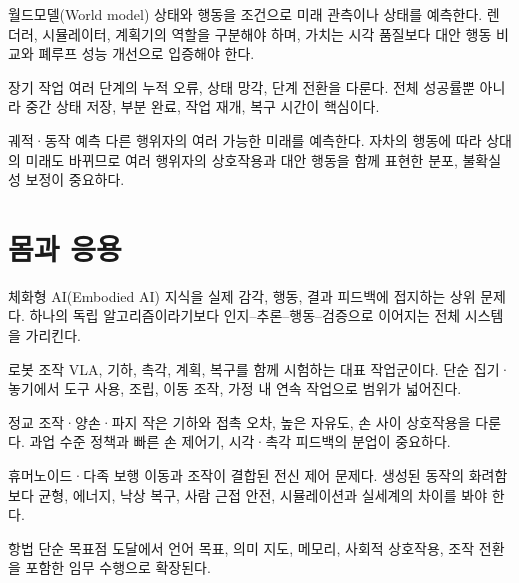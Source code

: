 \documentclass[11pt,openany]{book}
\begin{document}
\begin{termcard}{월드모델(World model)}
상태와 행동을 조건으로 미래 관측이나 상태를 예측한다. 렌더러, 시뮬레이터, 계획기의 역할을 구분해야 하며, 가치는 시각 품질보다 대안 행동 비교와 폐루프 성능 개선으로 입증해야 한다.
\end{termcard}

\begin{termcard}{장기 작업}
여러 단계의 누적 오류, 상태 망각, 단계 전환을 다룬다. 전체 성공률뿐 아니라 중간 상태 저장, 부분 완료, 작업 재개, 복구 시간이 핵심이다.
\end{termcard}

\begin{termcard}{궤적·동작 예측}
다른 행위자의 여러 가능한 미래를 예측한다. 자차의 행동에 따라 상대의 미래도 바뀌므로 여러 행위자의 상호작용과 대안 행동을 함께 표현한 분포, 불확실성 보정이 중요하다.
\end{termcard}

\chapter*{몸과 응용}

\begin{termcard}{체화형 AI(Embodied AI)}
지식을 실제 감각, 행동, 결과 피드백에 접지하는 상위 문제다. 하나의 독립 알고리즘이라기보다 인지--추론--행동--검증으로 이어지는 전체 시스템을 가리킨다.
\end{termcard}

\begin{termcard}{로봇 조작}
VLA, 기하, 촉각, 계획, 복구를 함께 시험하는 대표 작업군이다. 단순 집기·놓기에서 도구 사용, 조립, 이동 조작, 가정 내 연속 작업으로 범위가 넓어진다.
\end{termcard}

\begin{termcard}{정교 조작·양손·파지}
작은 기하와 접촉 오차, 높은 자유도, 손 사이 상호작용을 다룬다. 과업 수준 정책과 빠른 손 제어기, 시각·촉각 피드백의 분업이 중요하다.
\end{termcard}

\begin{termcard}{휴머노이드·다족 보행}
이동과 조작이 결합된 전신 제어 문제다. 생성된 동작의 화려함보다 균형, 에너지, 낙상 복구, 사람 근접 안전, 시뮬레이션과 실세계의 차이를 봐야 한다.
\end{termcard}

\begin{termcard}{항법}
단순 목표점 도달에서 언어 목표, 의미 지도, 메모리, 사회적 상호작용, 조작 전환을 포함한 임무 수행으로 확장된다.
\end{termcard}
\end{document}
